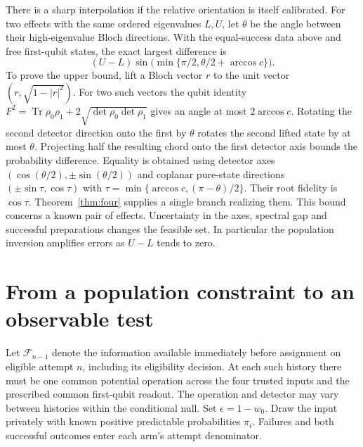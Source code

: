 \documentclass[11pt,letterpaper]{article}
\newcommand{\tr}{\operatorname{Tr}}\newcommand{\TV}{\operatorname{TV}}\newcommand{\E}{\mathbb E}\newcommand{\id}{\mathbb I}\newcommand{\calB}{\mathcal B}\newcommand{\norm}[1]{\left\lVert#1\right\rVert}
\begin{document}
There is a sharp interpolation if the relative orientation is itself calibrated. For two effects with the same ordered eigenvalues $L,U$, let $\theta$ be the angle between their high-eigenvalue Bloch directions. With the equal-success data above and free first-qubit states, the exact largest difference is
\[
 (U-L)\sin\bigl(\min\{\pi/2,\theta/2+\arccos c\}\bigr).
\]
To prove the upper bound, lift a Bloch vector $r$ to the unit vector $(r,\sqrt{1-|r|^2})$. For two such vectors the qubit identity $F^2=\tr\rho_0\rho_1+2\sqrt{\det\rho_0\det\rho_1}$ gives an angle at most $2\arccos c$. Rotating the second detector direction onto the first by $\theta$ rotates the second lifted state by at most $\theta$. Projecting half the resulting chord onto the first detector axis bounds the probability difference. Equality is obtained using detector axes $(\cos(\theta/2),\pm\sin(\theta/2))$ and coplanar pure-state directions $(\pm\sin\tau,\cos\tau)$ with $\tau=\min\{\arccos c,(\pi-\theta)/2\}$. Their root fidelity is $\cos\tau$. Theorem~\ref{thm:four} supplies a single branch realizing them. This bound concerns a known pair of effects. Uncertainty in the axes, spectral gap and successful preparations changes the feasible set. In particular the population inversion amplifies errors as $U-L$ tends to zero.

\section{From a population constraint to an observable test}\label{sec:test}

Let $\mathcal F_{n-1}$ denote the information available immediately before assignment on eligible attempt $n$, including its eligibility decision. At each such history there must be one common potential operation across the four trusted inputs and the prescribed common first-qubit readout. The operation and detector may vary between histories within the conditional null. Set $\epsilon=1-w_0$. Draw the input privately with known positive predictable probabilities $\pi_i$. Failures and both successful outcomes enter each arm's attempt denominator.
\end{document}
